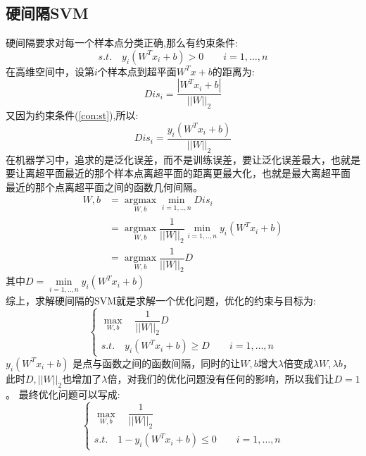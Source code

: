 \documentclass[withoutpreface,bwprint]{cumcmthesis} %
\begin{document}
	\subsection{\Large 硬间隔SVM}
	硬间隔要求对每一个样本点分类正确,那么有约束条件:
	\begin{equation}
		 s.t. \quad y_i\left( W^Tx_i+b \right) > 0  \quad \quad i=1,\ldots,n      \label{con:st}
	\end{equation}
	在高维空间中，设第$i$个样本点到超平面$W^Tx+b$的距离为:
	\begin{equation}
		Dis_i=\dfrac{|W^Tx_i+b|}{||W||_2}
	\end{equation}
		又因为约束条件(\ref{con:st}),所以:
	\begin{equation}
		Dis_i=\dfrac{y_i\left( W^Tx_i+b \right)}{||W||_2}
	\end{equation}
	在机器学习中，追求的是泛化误差，而不是训练误差，要让泛化误差最大，也就是要让离超平面最近的那个样本点离超平面的距离更最大化，也就是最大离超平面
	最近的那个点离超平面之间的函数几何间隔。
	\begin{align*}
		W,b &= \mathop{argmax} \limits_{W,b} \mathop{min} \limits_{i=1,..,n}  Dis_i \\
			&=\mathop{argmax} \limits_{W,b}  \dfrac{1}{||W||_2} \mathop{min} \limits_{i=1,..,n} y_i\left( W^Tx_i+b \right)\\
			&=\mathop{argmax} \limits_{W,b}  \dfrac{1}{||W||_2} D
	\end{align*}
	其中$D=\mathop{min} \limits_{i=1,..,n} y_i\left( W^Tx_i+b \right)$\\
	综上，求解硬间隔的SVM就是求解一个优化问题，优化的约束与目标为:
	\begin{equation}
	\begin{cases}
		\mathop{max} \limits_{W,b} \quad \dfrac{1}{||W||_2} D \\
		s.t. \quad y_i\left( W^Tx_i+b \right) \geq D  \quad \quad i=1,\ldots,n
	\end{cases}
	\end{equation}
	 $y_i\left( W^Tx_i+b \right)$ 是点与函数之间的函数间隔，同时的让$W,b$增大$\lambda$倍变成$\lambda W,\lambda b$，此时$D,||W||_2$也增加了$\lambda$倍，对我们的优化问题没有任何的影响，所以我们让$D=1$。
	 最终优化问题可以写成:
	\begin{equation}
	\begin{cases}
		\mathop{max} \limits_{W,b} \quad \dfrac{1}{||W||_2}  \\
		s.t. \quad 1-y_i\left( W^Tx_i+b \right) \leq 0  \quad \quad i=1,\ldots,n
	\end{cases}
	\end{equation}
\end{document}
